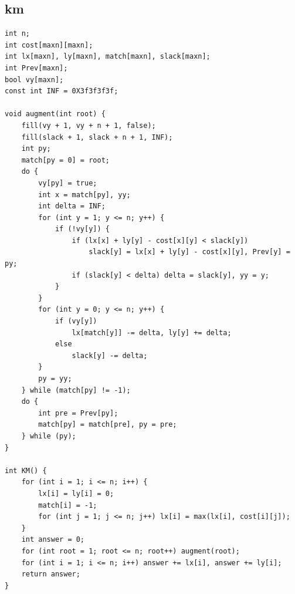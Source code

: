 \documentclass[twoside]{article}
\begin{document}
\subsection{km}
\begin{lstlisting}
int n;
int cost[maxn][maxn];
int lx[maxn], ly[maxn], match[maxn], slack[maxn];
int Prev[maxn];
bool vy[maxn];
const int INF = 0X3f3f3f3f;

void augment(int root) {
    fill(vy + 1, vy + n + 1, false);
    fill(slack + 1, slack + n + 1, INF);
    int py;
    match[py = 0] = root;
    do {
        vy[py] = true;
        int x = match[py], yy;
        int delta = INF;
        for (int y = 1; y <= n; y++) {
            if (!vy[y]) {
                if (lx[x] + ly[y] - cost[x][y] < slack[y])
                    slack[y] = lx[x] + ly[y] - cost[x][y], Prev[y] = py;
                if (slack[y] < delta) delta = slack[y], yy = y;
            }
        }
        for (int y = 0; y <= n; y++) {
            if (vy[y])
                lx[match[y]] -= delta, ly[y] += delta;
            else
                slack[y] -= delta;
        }
        py = yy;
    } while (match[py] != -1);
    do {
        int pre = Prev[py];
        match[py] = match[pre], py = pre;
    } while (py);
}

int KM() {
    for (int i = 1; i <= n; i++) {
        lx[i] = ly[i] = 0;
        match[i] = -1;
        for (int j = 1; j <= n; j++) lx[i] = max(lx[i], cost[i][j]);
    }
    int answer = 0;
    for (int root = 1; root <= n; root++) augment(root);
    for (int i = 1; i <= n; i++) answer += lx[i], answer += ly[i];
    return answer;
}\end{lstlisting}
\end{document}
